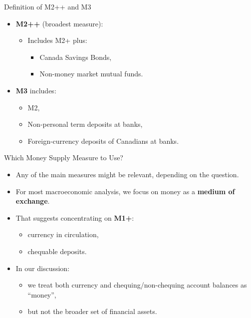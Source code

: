 \documentclass[aspectratio=169]{beamer}
\begin{document}
\begin{frame}{Definition of M2++ and M3}
\transfade
\begin{itemize}
  \item \textbf{M2++} (broadest measure):
  \begin{itemize}
    \item Includes M2+ plus:
    \begin{itemize}
      \item Canada Savings Bonds,
      \item Non-money market mutual funds.
    \end{itemize}
  \end{itemize}
  \item \textbf{M3} includes:
  \begin{itemize}
    \item M2,
    \item Non-personal term deposits at banks,
    \item Foreign-currency deposits of Canadians at banks.
  \end{itemize}
\end{itemize}
\end{frame}

\begin{frame}{Which Money Supply Measure to Use?}
\transfade
\begin{itemize}
  \item Any of the main measures might be relevant, depending on the question.
  \item For most macroeconomic analysis, we focus on money as a \textbf{medium of exchange}.
  \item That suggests concentrating on \textbf{M1+}:
  \begin{itemize}
    \item currency in circulation,
    \item chequable deposits.
  \end{itemize}
  \item In our discussion:
  \begin{itemize}
    \item we treat both currency and chequing/non-chequing account balances as “money”,
    \item but not the broader set of financial assets.
  \end{itemize}
\end{itemize}
\end{frame}

\end{document}
